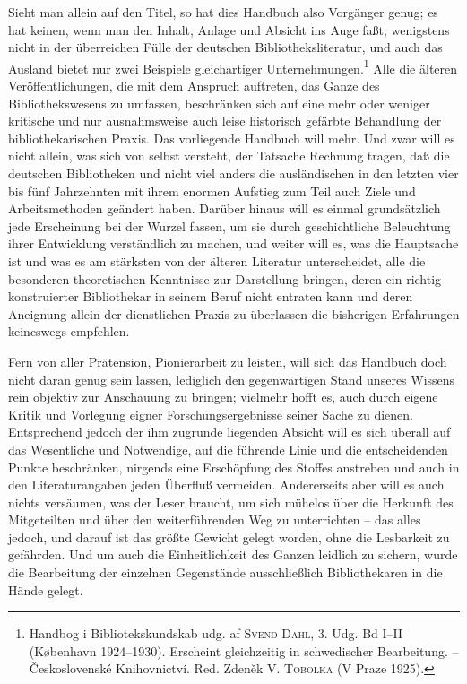 \documentclass[a4paper,
fontsize=11pt,
oneside,
numbers=noperiodatend,
parskip=half-,
bibliography=totoc,
final
]{scrartcl}
\begin{document}
Sieht man allein auf den Titel, so hat dies Handbuch also Vorgänger
genug; es hat keinen, wenn man den Inhalt, Anlage und Absicht ins Auge
faßt, wenigstens nicht in der überreichen Fülle der deutschen
Bibliotheksliteratur, und auch das Ausland bietet nur zwei Beispiele
gleichartiger Unternehmungen.\footnote{Handbog i Bibliotekskundskab udg.
  af \textsc{Svend Dahl}, 3. Udg. Bd I--II (København 1924--1930).
  Erscheint gleichzeitig in schwedischer Bearbeitung. -- Československé
  Knihovnictví. Red. Zdeněk V. \textsc{Tobolka} (V Praze 1925).} Alle
die älteren Veröffentlichungen, die mit dem Anspruch auftreten, das
Ganze des Bibliothekswesens zu umfassen, beschränken sich auf eine mehr
oder weniger kritische und nur ausnahmsweise auch leise historisch
gefärbte Behandlung der bibliothekarischen Praxis. Das vorliegende
Handbuch will mehr. Und zwar will es nicht allein, was sich von selbst
versteht, der Tatsache Rechnung tragen, daß die deutschen Bibliotheken
und nicht viel anders die ausländischen in den letzten vier bis fünf
Jahrzehnten mit ihrem enormen Aufstieg zum Teil auch Ziele und
Arbeitsmethoden geändert haben. Darüber hinaus will es einmal
grundsätzlich jede Erscheinung bei der Wurzel fassen, um sie durch
geschichtliche Beleuchtung ihrer Entwicklung verständlich zu machen, und
weiter will es, was die Hauptsache ist und was es am stärksten von der
älteren Literatur unterscheidet, alle die besonderen theoretischen
Kenntnisse zur Darstellung bringen, deren ein richtig konstruierter
Bibliothekar in seinem Beruf nicht entraten kann und deren Aneignung
allein der dienstlichen Praxis zu überlassen die bisherigen Erfahrungen
keineswegs empfehlen.

Fern von aller Prätension, Pionierarbeit zu leisten, will sich das
Handbuch doch nicht daran genug sein lassen, lediglich den gegenwärtigen
Stand unseres Wissens rein objektiv zur Anschauung zu bringen; vielmehr
hofft es, auch durch eigene Kritik und Vorlegung eigner
Forschungsergebnisse seiner Sache zu dienen. Entsprechend jedoch der ihm
zugrunde liegenden Absicht will es sich überall auf das Wesentliche und
Notwendige, auf die führende Linie und die entscheidenden Punkte
beschränken, nirgends eine Erschöpfung des Stoffes anstreben und auch in
den Literaturangaben jeden Überfluß vermeiden. Andererseits aber will es
auch nichts versäumen, was der Leser braucht, um sich mühelos über die
Herkunft des Mitgeteilten und über den weiterführenden Weg zu
unterrichten -- das alles jedoch, und darauf ist das größte Gewicht
gelegt worden, ohne die Lesbarkeit zu gefährden. Und um auch die
Einheitlichkeit des Ganzen leidlich zu sichern, wurde die Bearbeitung
der einzelnen Gegenstände ausschließlich Bibliothekaren in die Hände
gelegt.
\end{document}
